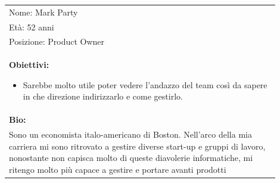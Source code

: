 \documentclass[a4paper, 11pt]{article}
\begin{document}
\begin{table}[H]
    \centering
    \begin{tabular}{|p{0.9\linewidth}|}
        \hline
        Nome: Mark Party                                                                                                                                                                                                                                                            \\
        Età: 52 anni                                                                                                                                                                                                                                                                \\
        Posizione: Product Owner                                                                                                                                                                                                                                                    \\
        \hline
        \begin{minipage}[t]{\linewidth}
            \textbf{Obiettivi:}
            \begin{itemize}
                \item Sarebbe molto utile poter vedere l'andazzo del team così da sapere in che direzione indirizzarlo e come gestirlo.
            \end{itemize}
        \end{minipage}                                                                                                                                                                                                                                              \\
        \hline
        \textbf{Bio:}                                                                                                                                                                                                                                                               \\
        Sono un economista italo-americano di Boston. Nell'arco della mia carriera mi sono ritrovato a gestire diverse start-up e gruppi di lavoro, nonostante non capisca molto di queste diavolerie informatiche, mi ritengo molto più capace a gestire e portare avanti prodotti \\
        \hline
    \end{tabular}
\end{table}
\end{document}
